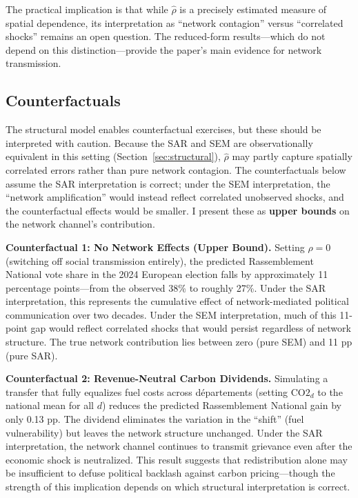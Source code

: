 \documentclass[12pt]{article}
\newcommand{\rn}{Rassemblement National}
\newcommand{\depts}{d\'{e}partements}
\begin{document}
The practical implication is that while $\hat{\rho}$ is a precisely estimated measure of spatial dependence, its interpretation as ``network contagion'' versus ``correlated shocks'' remains an open question. The reduced-form results---which do not depend on this distinction---provide the paper's main evidence for network transmission.

\subsection{Counterfactuals}

The structural model enables counterfactual exercises, but these should be interpreted with caution. Because the SAR and SEM are observationally equivalent in this setting (Section~\ref{sec:structural}), $\hat{\rho}$ may partly capture spatially correlated errors rather than pure network contagion. The counterfactuals below assume the SAR interpretation is correct; under the SEM interpretation, the ``network amplification'' would instead reflect correlated unobserved shocks, and the counterfactual effects would be smaller. I present these as \textbf{upper bounds} on the network channel's contribution.

\textbf{Counterfactual 1: No Network Effects (Upper Bound).} Setting $\rho = 0$ (switching off social transmission entirely), the predicted \rn{} vote share in the 2024 European election falls by approximately 11 percentage points---from the observed 38\% to roughly 27\%. Under the SAR interpretation, this represents the cumulative effect of network-mediated political communication over two decades. Under the SEM interpretation, much of this 11-point gap would reflect correlated shocks that would persist regardless of network structure. The true network contribution lies between zero (pure SEM) and 11 pp (pure SAR).

\textbf{Counterfactual 2: Revenue-Neutral Carbon Dividends.} Simulating a transfer that fully equalizes fuel costs across \depts{} (setting $\text{CO2}_d$ to the national mean for all $d$) reduces the predicted \rn{} gain by only 0.13 pp. The dividend eliminates the variation in the ``shift'' (fuel vulnerability) but leaves the network structure unchanged. Under the SAR interpretation, the network channel continues to transmit grievance even after the economic shock is neutralized. This result suggests that redistribution alone may be insufficient to defuse political backlash against carbon pricing---though the strength of this implication depends on which structural interpretation is correct.
\end{document}
